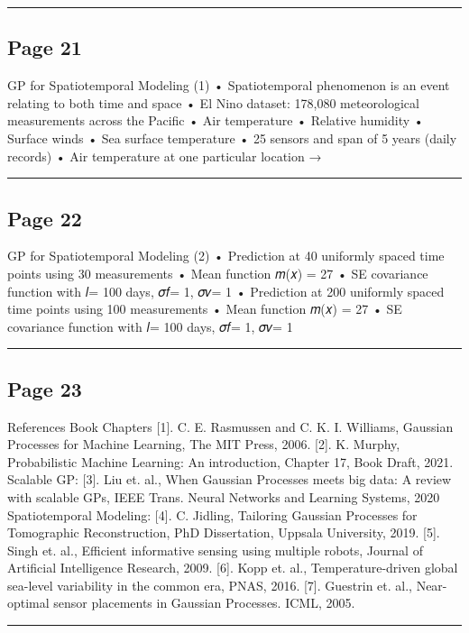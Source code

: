 \documentclass[
]{article}
\begin{document}
\begin{center}\rule{0.5\linewidth}{0.5pt}\end{center}

\subsection{Page 21}\label{page-21}

GP for Spatiotemporal Modeling (1) • Spatiotemporal phenomenon is an
event relating to both time and space • El Nino dataset: 178,080
meteorological measurements across the Pacific • Air temperature •
Relative humidity • Surface winds • Sea surface temperature • 25 sensors
and span of 5 years (daily records) • Air temperature at one particular
location →

\begin{center}\rule{0.5\linewidth}{0.5pt}\end{center}

\subsection{Page 22}\label{page-22}

GP for Spatiotemporal Modeling (2) • Prediction at 40 uniformly spaced
time points using 30 measurements • Mean function 𝑚(𝑥) = 27 • SE
covariance function with 𝑙= 100 days, 𝜎𝑓= 1, 𝜎𝑣= 1 • Prediction at 200
uniformly spaced time points using 100 measurements • Mean function 𝑚(𝑥)
= 27 • SE covariance function with 𝑙= 100 days, 𝜎𝑓= 1, 𝜎𝑣= 1

\begin{center}\rule{0.5\linewidth}{0.5pt}\end{center}

\subsection{Page 23}\label{page-23}

References Book Chapters {[}1{]}. C. E. Rasmussen and C. K. I. Williams,
Gaussian Processes for Machine Learning, The MIT Press, 2006. {[}2{]}.
K. Murphy, Probabilistic Machine Learning: An introduction, Chapter 17,
Book Draft, 2021. Scalable GP: {[}3{]}. Liu et. al., When Gaussian
Processes meets big data: A review with scalable GPs, IEEE Trans. Neural
Networks and Learning Systems, 2020 Spatiotemporal Modeling: {[}4{]}. C.
Jidling, Tailoring Gaussian Processes for Tomographic Reconstruction,
PhD Dissertation, Uppsala University, 2019. {[}5{]}. Singh et. al.,
Efficient informative sensing using multiple robots, Journal of
Artificial Intelligence Research, 2009. {[}6{]}. Kopp et. al.,
Temperature-driven global sea-level variability in the common era, PNAS,
2016. {[}7{]}. Guestrin et. al., Near-optimal sensor placements in
Gaussian Processes. ICML, 2005.

\begin{center}\rule{0.5\linewidth}{0.5pt}\end{center}
\end{document}
